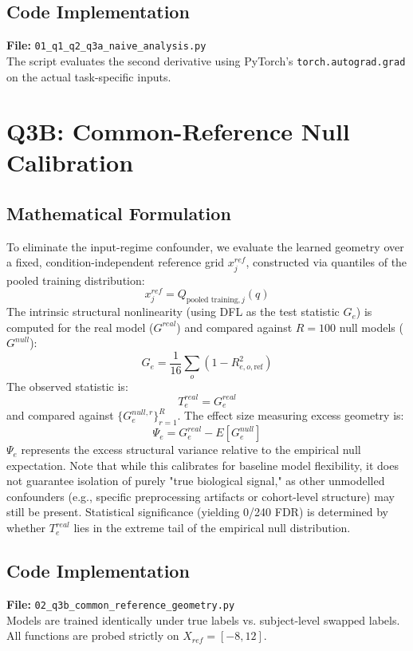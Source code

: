 \documentclass{article}
\begin{document}
\subsection{Code Implementation}
\textbf{File:} \texttt{01\_q1\_q2\_q3a\_naive\_analysis.py} \\
The script evaluates the second derivative using PyTorch's \texttt{torch.autograd.grad} on the actual task-specific inputs.

\section{Q3B: Common-Reference Null Calibration}
\subsection{Mathematical Formulation}
To eliminate the input-regime confounder, we evaluate the learned geometry over a fixed, condition-independent reference grid $x^{ref}_j$, constructed via quantiles of the pooled training distribution:
\begin{equation}
x^{ref}_j = Q_{\text{pooled training},j}(q)
\end{equation}
The intrinsic structural nonlinearity (using DFL as the test statistic $G_e$) is computed for the real model ($G^{real}$) and compared against $R=100$ null models ($G^{null}$):
\begin{equation}
G_e = \frac{1}{16} \sum_o (1 - R^2_{e,o,\text{ref}})
\end{equation}
The observed statistic is:
\begin{equation}
T_e^{real} = G_e^{real}
\end{equation}
and compared against $\{G_e^{null,r}\}_{r=1}^R$. 
The effect size measuring excess geometry is:
\begin{equation}
\Psi_e = G_e^{real} - E[G_e^{null}]
\end{equation}
$\Psi_e$ represents the excess structural variance relative to the empirical null expectation. Note that while this calibrates for baseline model flexibility, it does not guarantee isolation of purely "true biological signal," as other unmodelled confounders (e.g., specific preprocessing artifacts or cohort-level structure) may still be present. Statistical significance (yielding 0/240 FDR) is determined by whether $T_e^{real}$ lies in the extreme tail of the empirical null distribution.

\subsection{Code Implementation}
\textbf{File:} \texttt{02\_q3b\_common\_reference\_geometry.py} \\
Models are trained identically under true labels vs. subject-level swapped labels. All functions are probed strictly on $X_{ref} = [-8, 12]$.
\end{document}
